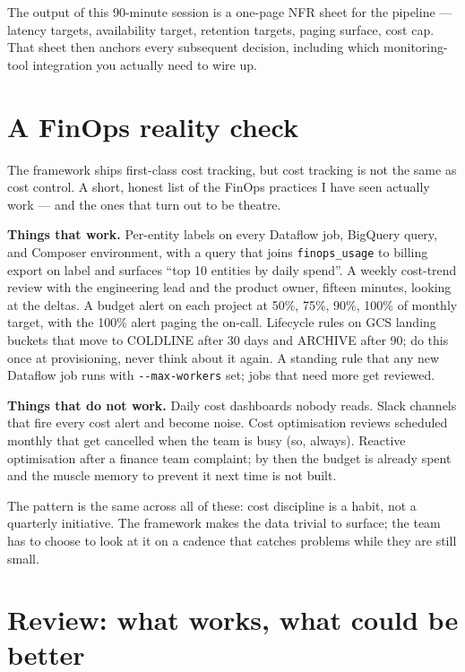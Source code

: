 \documentclass[
  11pt,
  british,
  oneside]{book}
\begin{document}
The output of this 90-minute session is a one-page NFR sheet for the
pipeline --- latency targets, availability target, retention targets,
paging surface, cost cap. That sheet then anchors every subsequent
decision, including which monitoring-tool integration you actually need
to wire up.

\hypertarget{a-finops-reality-check}{%
\section{A FinOps reality check}\label{a-finops-reality-check}}

The framework ships first-class cost tracking, but cost tracking is not
the same as cost control. A short, honest list of the FinOps practices I
have seen actually work --- and the ones that turn out to be theatre.

\textbf{Things that work.} Per-entity labels on every Dataflow job,
BigQuery query, and Composer environment, with a query that joins
\texttt{finops\_usage} to billing export on label and surfaces ``top 10
entities by daily spend''. A weekly cost-trend review with the
engineering lead and the product owner, fifteen minutes, looking at the
deltas. A budget alert on each project at 50\%, 75\%, 90\%, 100\% of
monthly target, with the 100\% alert paging the on-call. Lifecycle rules
on GCS landing buckets that move to COLDLINE after 30 days and ARCHIVE
after 90; do this once at provisioning, never think about it again. A
standing rule that any new Dataflow job runs with
\texttt{-\/-max-workers} set; jobs that need more get reviewed.

\textbf{Things that do not work.} Daily cost dashboards nobody reads.
Slack channels that fire every cost alert and become noise. Cost
optimisation reviews scheduled monthly that get cancelled when the team
is busy (so, always). Reactive optimisation after a finance team
complaint; by then the budget is already spent and the muscle memory to
prevent it next time is not built.

The pattern is the same across all of these: cost discipline is a habit,
not a quarterly initiative. The framework makes the data trivial to
surface; the team has to choose to look at it on a cadence that catches
problems while they are still small.

\hypertarget{review-what-works-what-could-be-better-4}{%
\section{Review: what works, what could be
better}\label{review-what-works-what-could-be-better-4}}
\end{document}
